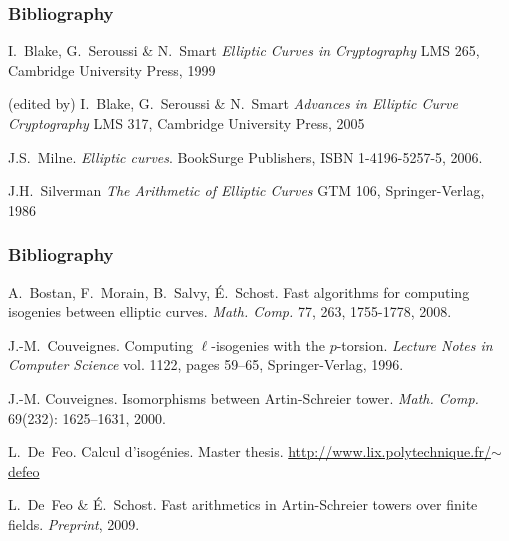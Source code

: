 \documentclass[10pt]{beamer}
\newcommand{\0}{\mathcal{O}}  %
\begin{document}
\begin{frame}
  \frametitle{Bibliography}

  \begin{thebibliography}{1}
    \beamertemplatebookbibitems
    
   I.~Blake, G.~Seroussi \& N.~Smart
    \newblock \emph{Elliptic Curves in Cryptography}
    \newblock LMS 265, Cambridge University Press, 1999
    
   (edited by) I.~Blake, G.~Seroussi \& N.~Smart
    \newblock \emph{Advances in Elliptic Curve Cryptography}
    \newblock LMS 317, Cambridge University Press, 2005
        
   J.S.~Milne.
    \newblock \emph{Elliptic curves}.
    \newblock BookSurge Publishers, ISBN 1-4196-5257-5, 2006.

   J.H.~Silverman
    \newblock \emph{The Arithmetic of Elliptic Curves}
    \newblock GTM 106, Springer-Verlag, 1986
        
  \end{thebibliography}
\end{frame}

\begin{frame}
  \frametitle{Bibliography}

  \begin{thebibliography}{1}
    \beamertemplatearticlebibitems
    
   A.~Bostan,
    F.~Morain, B.~Salvy, É.~Schost.  \newblock Fast algorithms for
    computing isogenies between elliptic curves.
    \newblock \emph{Math. Comp.} 77, 263, 1755-1778, 2008.
    
  J.-M.~Couveignes.
    \newblock Computing $\ell$-isogenies with the $p$-torsion.
    \newblock \emph{Lecture Notes in Computer Science} vol. 1122, pages 59--65,
    Springer-Verlag, 1996.
    
   J.-M. Couveignes.
    \newblock Isomorphisms between {A}rtin-{S}chreier tower.
    \newblock \emph{Math. Comp.} 69(232): 1625--1631, 2000.

   L.~De~Feo.  \newblock Calcul d'isogénies.
    \newblock Master
    thesis. \href{http://www.lix.polytechnique.fr/~defeo/papers/master.pdf}{http://www.lix.polytechnique.fr/$\sim$defeo}

   L.~De~Feo \& É.~Schost.  \newblock
    Fast arithmetics in Artin-Schreier towers over finite fields.
    \newblock \emph{Preprint}, 2009.

  \end{thebibliography}
\end{frame}
\end{document}
